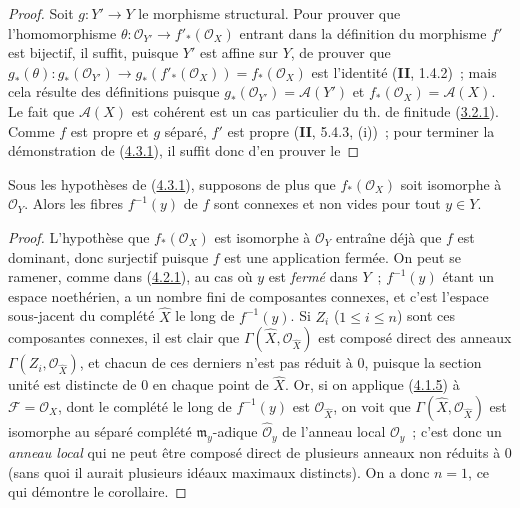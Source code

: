 \begin{proof}
Soit $g:Y'\to Y$ le morphisme structural. Pour prouver que l'homomorphisme
$\theta:\mathcal O_{Y'}\to f'_*(\mathcal O_X)$ entrant dans la définition
du morphisme $f'$ est bijectif, il suffit, puisque $Y'$ est affine sur $Y$,
de prouver que
$g_*(\theta):g_*(\mathcal O_{Y'})\longrightarrow
g_*(f'_*(\mathcal O_X))=f_*(\mathcal O_X)$
est l'identité (\textbf{II}, 1.4.2)~; mais cela résulte des définitions puisque
$g_*(\mathcal O_{Y'})=\mathcal A(Y')$ et
$f_*(\mathcal O_X)=\mathcal A(X)$. Le fait que $\mathcal A(X)$ est
cohérent est un cas particulier du th. de finitude
(\hyperref[III.3.2.1-fr]{3.2.1}). Comme $f$ est propre et $g$ séparé,
$f'$ est propre (\textbf{II}, 5.4.3, (i))~; pour terminer la démonstration de
(\hyperref[III.4.3.1-fr]{4.3.1}), il suffit donc d'en prouver le
\end{proof}

\begin{corollary}[4.3.2]
\label{III.4.3.2-fr}
Sous les hypothèses de \textup{(\hyperref[III.4.3.1-fr]{4.3.1})}, supposons de plus
que $f_*(\mathcal O_X)$ soit isomorphe à $\mathcal O_Y$. Alors les fibres
$f^{-1}(y)$ de $f$ sont connexes et non vides pour tout $y\in Y$.
\end{corollary}

\begin{proof}
L'hypothèse que $f_*(\mathcal O_X)$ est isomorphe à $\mathcal O_Y$
entraîne déjà que $f$ est dominant, donc surjectif puisque $f$ est une
application fermée. On peut se ramener, comme dans
(\hyperref[III.4.2.1-fr]{4.2.1}), au cas où $y$ est \emph{fermé} dans $Y$~;
$f^{-1}(y)$ étant un espace noethérien, a un nombre fini de composantes
connexes, et c'est l'espace sous-jacent du complété $\widehat X$ le long de
$f^{-1}(y)$. Si $Z_i$ ($1\leq i\leq n$) sont ces composantes connexes, il
est clair que $\Gamma(\widehat X,\mathcal O_{\widehat X})$ est composé
direct des anneaux $\Gamma(Z_i,\mathcal O_{\widehat X})$, et chacun de ces
derniers n'est pas réduit à $0$, puisque la section unité est distincte de
$0$ en chaque point de $\widehat X$. Or, si on applique
(\hyperref[III.4.1.5-fr]{4.1.5}) à $\mathcal F=\mathcal O_X$, dont le
complété le long de $f^{-1}(y)$ est $\mathcal O_{\widehat X}$, on voit que
$\Gamma(\widehat X,\mathcal O_{\widehat X})$ est isomorphe au séparé
complété $\mathfrak m_y$-adique $\widehat{\mathcal O}_y$ de l'anneau local
$\mathcal O_y$~; c'est donc un \emph{anneau local} qui ne peut être composé
direct de plusieurs anneaux non réduits à $0$ (sans quoi il aurait
plusieurs idéaux maximaux distincts). On a donc $n=1$, ce qui démontre le
corollaire.
\end{proof}

